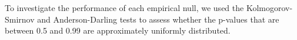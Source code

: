 \documentclass[a4paper,11pt]{article}
\theoremstyle{plain}
\theoremstyle{definition}
\def\calI{\mathcal{I}}
\theoremstyle{plain}
\newcommand{\nickname}{{\text{RANC}}}
\newcommand{\hypothesisIndex}[1]{{\calI_{#1}}}
\newcommand{\responseTreatment}[1]{{Y_{#1}^{\text{t}}}}
\newcommand{\responseControl}[1]{{Y_{#1}^{\text{c}}}}
\begin{document}
To investigate the performance of each empirical null, we used
the Kolmogorov-Smirnov and Anderson-Darling tests to
assess whether the p-values that are between 0.5 and 0.99 are
approximately uniformly distributed.
\end{document}
